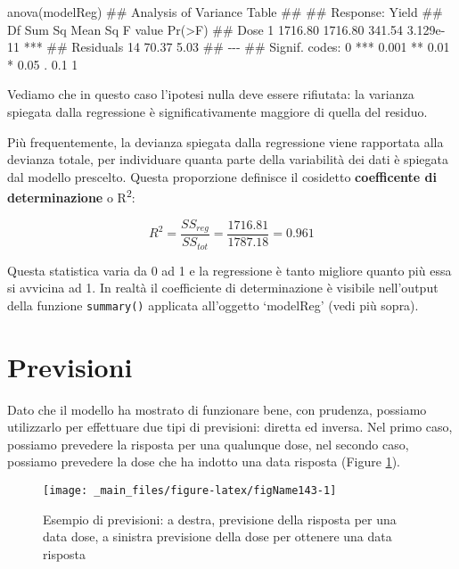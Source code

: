 \documentclass[a4paper,12pt,oneside]{book}
\newenvironment{Shaded}{\begin{snugshade}}{\end{snugshade}}
\newcommand{\DocumentationTok}[1]{#1}
\newcommand{\FunctionTok}[1]{#1}
\newcommand{\NormalTok}[1]{#1}
\begin{document}
\begin{Shaded}
\begin{Highlighting}[]
\FunctionTok{anova}\NormalTok{(modelReg)}
\DocumentationTok{\#\# Analysis of Variance Table}
\DocumentationTok{\#\# }
\DocumentationTok{\#\# Response: Yield}
\DocumentationTok{\#\#           Df  Sum Sq Mean Sq F value    Pr(\textgreater{}F)    }
\DocumentationTok{\#\# Dose       1 1716.80 1716.80  341.54 3.129e{-}11 ***}
\DocumentationTok{\#\# Residuals 14   70.37    5.03                      }
\DocumentationTok{\#\# {-}{-}{-}}
\DocumentationTok{\#\# Signif. codes:  0 \textquotesingle{}***\textquotesingle{} 0.001 \textquotesingle{}**\textquotesingle{} 0.01 \textquotesingle{}*\textquotesingle{} 0.05 \textquotesingle{}.\textquotesingle{} 0.1 \textquotesingle{} \textquotesingle{} 1}
\end{Highlighting}
\end{Shaded}

Vediamo che in questo caso l'ipotesi nulla deve essere rifiutata: la varianza spiegata dalla regressione è significativamente maggiore di quella del residuo.

Più frequentemente, la devianza spiegata dalla regressione viene rapportata alla devianza totale, per individuare quanta parte della variabilità dei dati è spiegata dal modello prescelto. Questa proporzione definisce il cosidetto \textbf{coefficente di determinazione} o R\textsuperscript{2}:

\[R^2 = \frac{SS_{reg}}{SS_{tot}} = \frac{1716.81}{1787.18} = 0.961\]

Questa statistica varia da 0 ad 1 e la regressione è tanto migliore quanto più essa si avvicina ad 1. In realtà il coefficiente di determinazione è visibile nell'output della funzione \texttt{summary()} applicata all'oggetto `modelReg' (vedi più sopra).

\hypertarget{previsioni}{%
\section{Previsioni}\label{previsioni}}

Dato che il modello ha mostrato di funzionare bene, con prudenza, possiamo utilizzarlo per effettuare due tipi di previsioni: diretta ed inversa. Nel primo caso, possiamo prevedere la risposta per una qualunque dose, nel secondo caso, possiamo prevedere la dose che ha indotto una data risposta (Figure \ref{fig:figName143}).

\begin{figure}

{\centering \texttt{[image: \_main\_files/figure-latex/figName143-1]} 

}

\caption{Esempio di previsioni: a destra, previsione della risposta per una data dose, a sinistra previsione della dose per ottenere una data risposta}\label{fig:figName143}
\end{figure}
\end{document}

